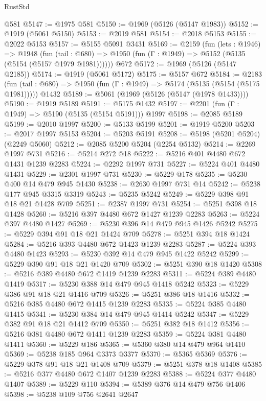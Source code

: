 \begin{lexlean}{RustStd}
\begin{coremodule}
    @581
@5147 := @1975 @581
@5150 := @1969 (@5126 (@5147 @1983))
@5152 := @1919 (@5061 @5150)
@5153 := @2019 @581
@5154 := @2018 @5153
@5155 := @2022 @5153
@5157 := @5155 @5091 @3431
@5169 := @2159
    (fun (lets : @1946) =>
    @1948
      (fun (tail : @680) => @1950 (fun (Γ : @1949) => @5152 (@5135 (@5154 (@5157 @1979 @1981))))))
    @672
@5172 := @1969 (@5126 (@5147 @2185))
@5174 := @1919 (@5061 @5172)
@5175 := @5157 @672
@5184 := @2183
    (fun (tail : @680) => @1950 (fun (Γ : @1949) => @5174 (@5135 (@5154 (@5175 @1981)))))
    @1432
@5189 := @5061 (@1969 (@5126 (@5147 (@1978 @1433))))
@5190 := @1919 @5189
@5191 := @5175 @1432
@5197 := @2201 (fun (Γ : @1949) => @5190 (@5135 (@5154 @5191))) @1997
@5198 := @2085 @5189
@5199 := @2010 @1997
@5200 := @5133 @5199
@5201 := @1919 @5200
@5203 := @2017 @1997 @5153
@5204 := @5203 @5191
@5208 := @5198 (@5201 @5204) (@2249 @5060)
@5212 := @2085 @5200 @5204 (@2254 @5132)
@5214 := @2269 @1997 @731
@5216 := @5214 @272 @18
@5222 := @5216 @401 @4480 @672 @1431 @1239 @2283
@5224 := @2292 @1997 @731
@5227 := @5224 @401 @4480 @1431
@5229 := @2301 @1997 @731
@5230 := @5229 @178
@5235 := @5230 @400 @14 @479 @945 @1430
@5238 := @2630 @1997 @731 @14
@5242 := @5238 @177 @945 @3315 @3319
@5243 := @5235 @5242
@5249 := @5229 @398 @91 @18 @21 @1428 @709
@5251 := @2387 @1997 @731
@5254 := @5251 @398 @18 @1428
@5260 := @5216 @397 @4480 @672 @1427 @1239 @2283
@5263 := @5224 @397 @4480 @1427
@5269 := @5230 @396 @14 @479 @945 @1426 @5242
@5275 := @5229 @394 @91 @18 @21 @1424 @709
@5278 := @5251 @394 @18 @1424
@5284 := @5216 @393 @4480 @672 @1423 @1239 @2283
@5287 := @5224 @393 @4480 @1423
@5293 := @5230 @392 @14 @479 @945 @1422 @5242
@5299 := @5229 @390 @91 @18 @21 @1420 @709
@5302 := @5251 @390 @18 @1420
@5308 := @5216 @389 @4480 @672 @1419 @1239 @2283
@5311 := @5224 @389 @4480 @1419
@5317 := @5230 @388 @14 @479 @945 @1418 @5242
@5323 := @5229 @386 @91 @18 @21 @1416 @709
@5326 := @5251 @386 @18 @1416
@5332 := @5216 @385 @4480 @672 @1415 @1239 @2283
@5335 := @5224 @385 @4480 @1415
@5341 := @5230 @384 @14 @479 @945 @1414 @5242
@5347 := @5229 @382 @91 @18 @21 @1412 @709
@5350 := @5251 @382 @18 @1412
@5356 := @5216 @381 @4480 @672 @1411 @1239 @2283
@5359 := @5224 @381 @4480 @1411
@5360 := @5229 @186
@5365 := @5360 @380 @14 @479 @964 @1410
@5369 := @5238 @185 @964 @3373 @3377
@5370 := @5365 @5369
@5376 := @5229 @378 @91 @18 @21 @1408 @709
@5379 := @5251 @378 @18 @1408
@5385 := @5216 @377 @4480 @672 @1407 @1239 @2283
@5388 := @5224 @377 @4480 @1407
@5389 := @5229 @110
@5394 := @5389 @376 @14 @479 @756 @1406
@5398 := @5238 @109 @756 @2641 @2647

\end{coremodule}
\end{lexlean}
